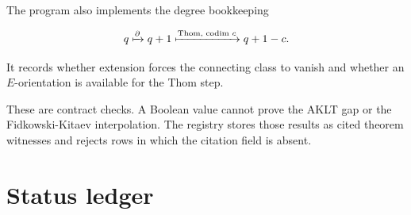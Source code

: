 \documentclass[12pt]{article}
\theoremstyle{definition}
\theoremstyle{remark}
\begin{document}
The program also implements the degree bookkeeping

\begin{equation}
  q\xmapsto{\partial}q+1
  \xmapsto{\text{Thom, codim }c}q+1-c.
\end{equation}

It records whether extension forces the connecting class to vanish and
whether an $E$-orientation is available for the Thom step.

These are contract checks.  A Boolean value cannot prove the AKLT gap or the
Fidkowski-Kitaev interpolation.  The registry stores those results as cited
theorem witnesses and rejects rows in which the citation field is absent.

\section{Status ledger}
\end{document}
